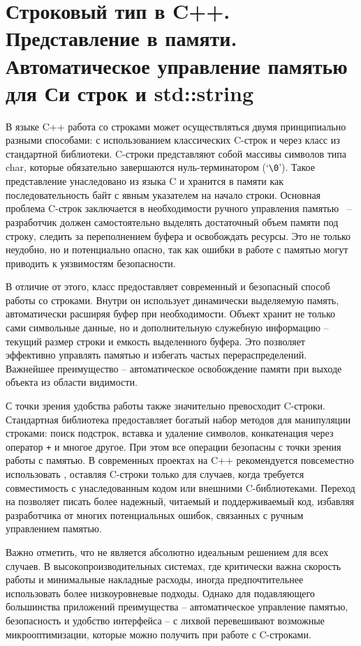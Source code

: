 \section{Строковый тип в C++. Представление в памяти. Автоматическое управление памятью для Си строк и std::string}
В языке C++ работа со строками может осуществляться двумя принципиально разными способами: с использованием классических C-строк и через класс  из 
стандартной библиотеки. C-строки представляют собой массивы символов типа char, которые обязательно завершаются нуль-терминатором (`\verb|\0|'). Такое представление унаследовано из 
языка C и хранится в памяти как последовательность байт с явным указателем на начало строки. Основная проблема C-строк заключается в необходимости ручного управления памятью
~-- разработчик должен самостоятельно выделять достаточный объем памяти под строку, следить за переполнением буфера и освобождать ресурсы. Это не только неудобно, но и 
потенциально опасно, так как ошибки в работе с памятью могут приводить к уязвимостям безопасности.

В отличие от этого, класс  предоставляет современный и безопасный способ работы со строками. Внутри он использует динамически выделяемую память, 
автоматически расширяя буфер при необходимости. Объект  хранит не только сами символьные данные, но и дополнительную служебную информацию -- текущий 
размер строки и емкость выделенного буфера. Это позволяет эффективно управлять памятью и избегать частых перераспределений. Важнейшее преимущество  -- 
автоматическое освобождение памяти при выходе объекта из области видимости.

С точки зрения удобства работы  также значительно превосходит C-строки. Стандартная библиотека предоставляет богатый набор методов для манипуляции 
строками: поиск подстрок, вставка и удаление символов, конкатенация через оператор \verb|+| и многое другое. При этом все операции безопасны с точки зрения работы с памятью. 
В современных проектах на C++ рекомендуется повсеместно использовать , оставляя C-строки только для случаев, когда требуется совместимость с 
унаследованным кодом или внешними C-библиотеками. Переход на  позволяет писать более надежный, читаемый и поддерживаемый код, избавляя разработчика от 
многих потенциальных ошибок, связанных с ручным управлением памятью.

Важно отметить, что  не является абсолютно идеальным решением для всех случаев. В высокопроизводительных системах, где критически важна скорость работы и 
минимальные накладные расходы, иногда предпочтительнее использовать более низкоуровневые подходы. Однако для подавляющего большинства приложений преимущества 
-- автоматическое управление памятью, безопасность и удобство интерфейса -- с лихвой перевешивают возможные микрооптимизации, которые можно получить при работе с C-строками.

